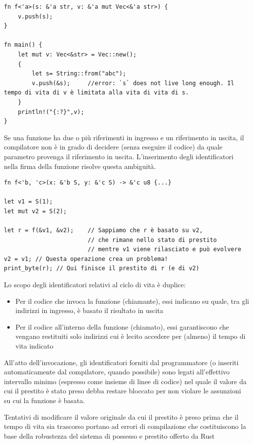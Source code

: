 \begin{verbatim}
fn f<'a>(s: &'a str, v: &'a mut Vec<&'a str>) {
    v.push(s);
}

fn main() {
    let mut v: Vec<&str> = Vec::new();
    {
        let s= String::from("abc");
        v.push(&s);     //error: `s` does not live long enough. Il tempo di vita di v è limitata alla vita di vita di s.
    }
    println!("{:?}",v);
}

\end{verbatim}

Se una funzione ha due o più riferimenti in ingresso e un riferimento in uscita, il
compilatore non è in grado di decidere (senza eseguire il codice) da quale
parametro provenga il riferimento in uscita. L'inserimento degli identificatori nella firma della funzione risolve questa ambiguità.

\begin{verbatim}
fn f<'b, 'c>(x: &'b S, y: &'c S) -> &'c u8 {...}

let v1 = S(1);
let mut v2 = S(2);

let r = f(&v1, &v2);    // Sappiamo che r è basato su v2,
                        // che rimane nello stato di prestito
                        // mentre v1 viene rilasciato e può evolvere
v2 = v1; // Questa operazione crea un problema!
print_byte(r); // Qui finisce il prestito di r (e di v2)
\end{verbatim}

Lo scopo degli identificatori relativi al ciclo di vita è duplice:

\begin{itemize}
  \item Per il codice che invoca la funzione (chiamante), essi indicano su quale, tra gli indirizzi in ingresso, è basato il risultato in uscita
  \item Per il codice all'interno della funzione (chiamato), essi garantiscono che vengano restituiti solo indirizzi cui è lecito accedere per (almeno) il tempo di vita indicato
\end{itemize}

All'atto dell'invocazione, gli identificatori forniti dal programmatore (o inseriti
automaticamente dal compilatore, quando possibile) sono legati all'effettivo
intervallo minimo (espresso come insieme di linee di codice) nel quale il valore da
cui il prestito è stato preso debba restare bloccato per non violare le assunzioni su
cui la funzione è basata.

Tentativi di modificare il valore originale da cui il prestito è preso prima che il tempo di vita sia trascorso portano ad errori di compilazione che costituiscono la base della robustezza del sistema di possesso e prestito offerto da Rust


